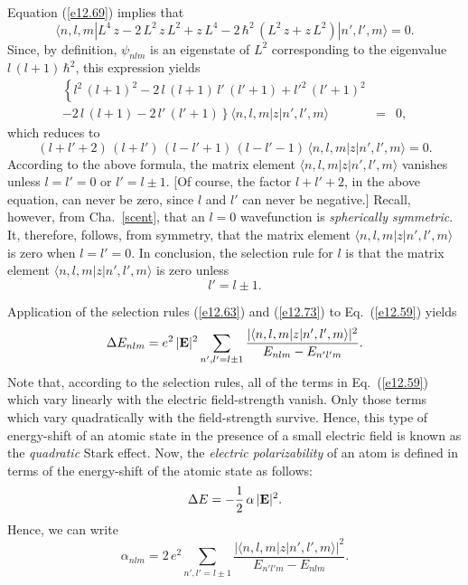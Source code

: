 Equation (\ref{e12.69}) implies that
\begin{equation}
\langle n,l,m|L^4\,z-2\,L^2\,z\,L^2 + z\,L^4 - 2\,\hbar^2\,(L^2\,z+z\,L^2) |n',l',m\rangle = 0.
\end{equation}
Since, by definition, $\psi_{nlm}$ is an eigenstate of $L^2$ corresponding
to the eigenvalue $l\,(l+1)\,\hbar^2$, this expression yields
\begin{eqnarray}
\left\{l^2\,(l+1)^2-2\,l\,(l+1)\,l'\,(l'+1) + l'^2\,(l'+1)^2\right.&&\nonumber\\[0.5ex]
\left.-2\,l\,(l+1) - 2\,l'\,(l'+1)\right\}\langle n,l,m|z|n',l',m\rangle& =& 0,
\end{eqnarray}
which reduces to
\begin{equation}
(l+l'+2)\,(l+l')\,(l-l'+1)\,(l-l'-1)\,\langle n,l,m|z|n',l',m\rangle = 0.
\end{equation}
According to the above formula, the matrix element $\langle n,l,m|z|n',l',m\rangle$ vanishes unless $l=l'=0$ or $l'=l\pm 1$. [Of course, the
factor $l+l'+2$, in the above equation, can never be zero, since $l$ and $l'$ can never be negative.]
Recall, however, from Cha.~\ref{scent}, that an $l=0$ wavefunction
is {\em spherically symmetric}. It, therefore, follows, from symmetry,
that the matrix element $\langle n,l,m|z|n',l',m\rangle$ is zero when
$l=l'=0$. In conclusion, the selection rule for $l$ is that the
matrix element $\langle n,l,m|z|n',l',m\rangle$ is zero unless
\begin{equation}\label{e12.73}
l' = l\pm 1.
\end{equation}

Application of the selection rules (\ref{e12.63}) and (\ref{e12.73}) to
Eq.~(\ref{e12.59}) yields
\begin{equation}\label{e12.74}
\Delta E_{nlm} = e^2\,|{\bf E}|^2\sum_{n',l'=l\pm 1}
\frac{|\langle n,l,m|z|n',l',m\rangle|^2}{E_{nlm}-E_{n'l'm}}.
\end{equation}
Note that,  according to the selection rules, all of the terms in Eq.~(\ref{e12.59}) which vary linearly with
the electric field-strength vanish.
Only those terms which vary quadratically with the field-strength
survive. Hence, this type of energy-shift of an atomic state in the
presence of a small electric field is known as the {\em quadratic}\/
Stark effect. Now, the {\em electric polarizability}\/ of an atom is
defined in terms of the energy-shift of the atomic state as follows:
\begin{equation}
\Delta E = -\frac{1}{2}\,\alpha\,|{\bf E}|^2.
\end{equation}
Hence, we can write
\begin{equation}\label{e12.76}
\alpha_{nlm} = 2\,e^2\sum_{n',l'=l\pm 1}
\frac{|\langle n,l,m|z|n',l',m\rangle|^2}{E_{n'l'm}-E_{nlm}}.
\end{equation}

